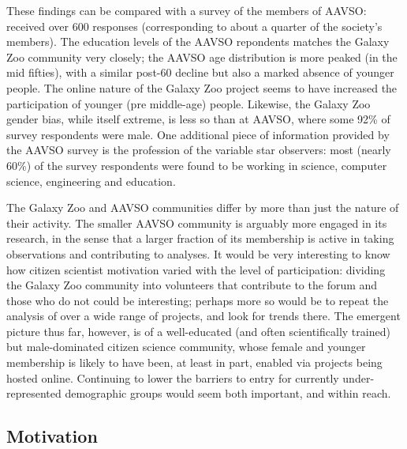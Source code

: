 \documentclass{ar2e}
\begin{document}
These findings can be compared with a survey of the members of AAVSO:
\citet{P+P2012} received over 600 responses (corresponding to about a quarter
of the society's members). The education levels of
the AAVSO repondents matches the Galaxy Zoo community very closely; the AAVSO
age distribution is more peaked (in the mid fifties), with a similar post-60
decline but also a marked absence of younger people. The online nature of the
Galaxy Zoo project seems to have increased the participation of younger (pre
middle-age) people. Likewise, the Galaxy Zoo gender bias, while itself
extreme, is less so than at AAVSO, where some 92\% of survey respondents were
male. One additional piece of information provided by the AAVSO survey is the
profession of the variable star observers: most (nearly 60\%) of the survey
respondents were found to be working in science, computer science, engineering
and education. 

The Galaxy Zoo and AAVSO communities differ by more than just the nature of
their activity. The smaller AAVSO community is arguably more engaged in its
research, in the sense that a larger fraction of its membership is active in
taking observations and contributing to analyses. It would be very interesting
to know how citizen scientist motivation varied with the level of
participation: dividing the Galaxy Zoo community into volunteers that
contribute to the forum and those who do not could be interesting; perhaps
more so would be to repeat the analysis of \citeauthor{Rad++2013} over a wide
range of projects, and look for trends there. The emergent picture thus far,
however, is of a well-educated (and often scientifically trained)  but
male-dominated citizen science community, whose female and younger membership
is likely to have been, at least in part, enabled via projects being hosted
online. Continuing to lower the barriers to entry for currently
under-represented demographic groups would seem both important, and within
reach.



\subsection{Motivation}
\label{sec:crowd:motivation}

\end{document}
